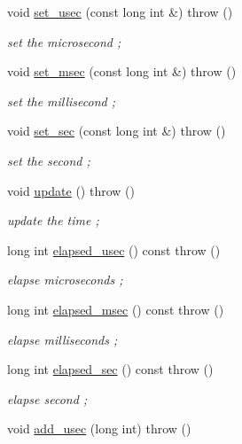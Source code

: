 \begin{DoxyCompactItemize}
void \hyperlink{classnubot_1_1Time_a0f45a32999f8bbf3a73ae3f0fbdf6bf4}{set\-\_\-usec} (const long int \&)  throw ()
\begin{DoxyCompactList}\small\item\em set the microsecond ; \end{DoxyCompactList}\item 
void \hyperlink{classnubot_1_1Time_a5fc4acf109f37af9772378a6d5e86d23}{set\-\_\-msec} (const long int \&)  throw ()
\begin{DoxyCompactList}\small\item\em set the millisecond ; \end{DoxyCompactList}\item 
void \hyperlink{classnubot_1_1Time_af52b25621c50caa9a2c4419f7a695577}{set\-\_\-sec} (const long int \&)  throw ()
\begin{DoxyCompactList}\small\item\em set the second ; \end{DoxyCompactList}\item 
void \hyperlink{classnubot_1_1Time_a2862404f9f2ca3f14b6b0a58d8540f75}{update} ()  throw ()
\begin{DoxyCompactList}\small\item\em update the time ; \end{DoxyCompactList}\item 
long int \hyperlink{classnubot_1_1Time_ab6bf73273c4ef7b45017ea9104909039}{elapsed\-\_\-usec} () const   throw ()
\begin{DoxyCompactList}\small\item\em elapse microseconds ; \end{DoxyCompactList}\item 
long int \hyperlink{classnubot_1_1Time_a518f8fd951b312c03bd9f725946e5fd1}{elapsed\-\_\-msec} () const   throw ()
\begin{DoxyCompactList}\small\item\em elapse milliseconds ; \end{DoxyCompactList}\item 
long int \hyperlink{classnubot_1_1Time_af40877857ced8437a7828188bc22e884}{elapsed\-\_\-sec} () const   throw ()
\begin{DoxyCompactList}\small\item\em elapse second ; \end{DoxyCompactList}\item 
void \hyperlink{classnubot_1_1Time_a13a0b0af1dc127c67f2533df6827a5fd}{add\-\_\-usec} (long int)  throw ()

\end{DoxyCompactItemize}
